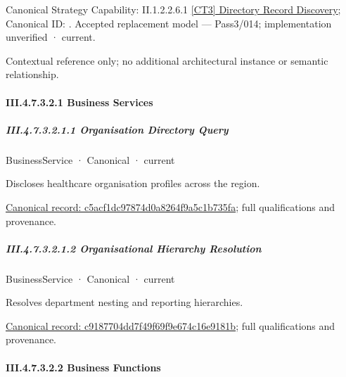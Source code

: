 {\small Canonical Strategy Capability: II.1.2.2.6.1 \hyperref[element:2bebb37d407a4816aed79e9a13e324e9]{[CT3] Directory Record Discovery}; Canonical ID: \texttt{}. Accepted replacement model — Pass3/014; implementation unverified · current.}\par
Contextual reference only; no additional architectural instance or semantic relationship.\par
\paragraph*{III.4.7.3.2.1 Business Services}
\label{navigation:III.4.7.3.2.1}

\subparagraph*{III.4.7.3.2.1.1 Organisation Directory Query}
\label{navigation:III.4.7.3.2.1.1}

\label{element:c5acf1dc97874d0a8264f9a5c1b735fa}
{\small BusinessService · Canonical · current}\par

Discloses healthcare organisation profiles across the region.


{\footnotesize \href{../../../../../../../continuum/business/business-service/c5acf1dc97874d0a8264f9a5c1b735fa.md}{Canonical record: c5acf1dc97874d0a8264f9a5c1b735fa}; full qualifications and provenance.}\par
\subparagraph*{III.4.7.3.2.1.2 Organisational Hierarchy Resolution}
\label{navigation:III.4.7.3.2.1.2}

\label{element:c9187704dd7f49f69f9e674c16e9181b}
{\small BusinessService · Canonical · current}\par

Resolves department nesting and reporting hierarchies.


{\footnotesize \href{../../../../../../../continuum/business/business-service/c9187704dd7f49f69f9e674c16e9181b.md}{Canonical record: c9187704dd7f49f69f9e674c16e9181b}; full qualifications and provenance.}\par
\paragraph*{III.4.7.3.2.2 Business Functions}
\label{navigation:III.4.7.3.2.2}

